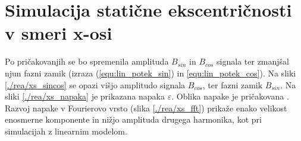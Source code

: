 \section{Simulacija statične ekscentričnosti v smeri x-osi}
Po pričakovanjih se bo spremenila amplituda $B_{sin}$ in $B_{cos}$ signala ter zmanjšal njun fazni zamik (izraza (\ref{equ:lin_potek_sin}) in \ref{equ:lin_potek_cos}). Na sliki \ref{./rea/xs_sincos} se opazi višjo amplitudo signala $B_{cos}$, ter fazni zamik $B_{sin}$. Na sliki \ref{./rea/xs_napaka} je prikazana napaka $\varepsilon$. Oblika napake je pričakovana \cite{AM8192}. Razvoj napake v Fourierovo vrsto (slika \ref{./rea/xs_fft}) prikaže enako velikost enosmerne komponente in nižjo amplituda drugega harmonika, kot pri simulacijah z linearnim modelom.
\newpage
